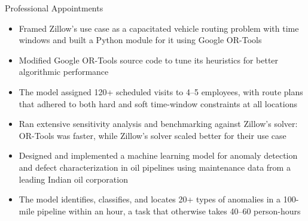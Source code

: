 \begin{rSection}{Professional Appointments}
\begin{itemize}
    \item Framed Zillow's use case as a capacitated vehicle routing problem with time windows and built a Python module for it using Google OR-Tools
    \item Modified Google OR-Tools source code to tune its heuristics for better algorithmic performance
    \item The model assigned 120+ scheduled visits to 4--5 employees, with route plans that adhered to both hard and soft time-window constraints at all locations
    \item Ran extensive sensitivity analysis and benchmarking against Zillow's solver: OR-Tools was faster, while Zillow's solver scaled better for their use case
\end{itemize}
\medskip

\begin{itemize}
    \item Designed and implemented a machine learning model for anomaly detection and defect characterization in oil pipelines using maintenance data from a leading Indian oil corporation
    \item The model identifies, classifies, and locates 20+ types of anomalies in a 100-mile pipeline within an hour, a task that otherwise takes 40--60 person-hours
\end{itemize}

\end{rSection}
